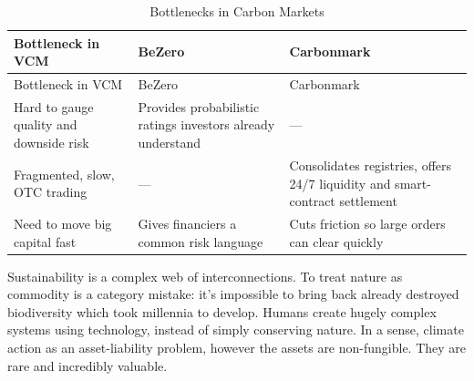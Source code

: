 \documentclass[
  12pt,
  letterpaper,
  DIV=11,
  numbers=noendperiod]{scrartcl}
\begin{document}
\def\pandoctableshortcapt{Bottlenecks in Carbon Markets}

\begin{longtable}[]{@{}
  >{\raggedright\arraybackslash}p{}
  >{\raggedright\arraybackslash}p{}
  >{\raggedright\arraybackslash}p{}@{}}
\caption[Bottlenecks in Carbon Markets]{Bottlenecks in Carbon
Markets}\tabularnewline
\toprule\noalign{}
\begin{minipage}[b]{\linewidth}\raggedright
Bottleneck in VCM
\end{minipage} & \begin{minipage}[b]{\linewidth}\raggedright
BeZero
\end{minipage} & \begin{minipage}[b]{\linewidth}\raggedright
Carbonmark
\end{minipage} \\
\midrule\noalign{}
\endfirsthead
\toprule\noalign{}
\begin{minipage}[b]{\linewidth}\raggedright
Bottleneck in VCM
\end{minipage} & \begin{minipage}[b]{\linewidth}\raggedright
BeZero
\end{minipage} & \begin{minipage}[b]{\linewidth}\raggedright
Carbonmark
\end{minipage} \\
\midrule\noalign{}
\endhead
\bottomrule\noalign{}
\endlastfoot
Hard to gauge quality and downside risk & Provides probabilistic ratings
investors already understand & --- \\
Fragmented, slow, OTC trading & --- & Consolidates registries, offers
24/7 liquidity and smart-contract settlement \\
Need to move big capital fast & Gives financiers a common risk language
& Cuts friction so large orders can clear quickly \\
\end{longtable}

\let\pandoctableshortcapt\relax

Sustainability is a complex web of interconnections. To treat nature as
commodity is a category mistake: it's impossible to bring back already
destroyed biodiversity which took millennia to develop. Humans create
hugely complex systems using technology, instead of simply conserving
nature. In a sense, climate action as an asset-liability problem,
however the assets are non-fungible. They are rare and incredibly
valuable.
\end{document}
